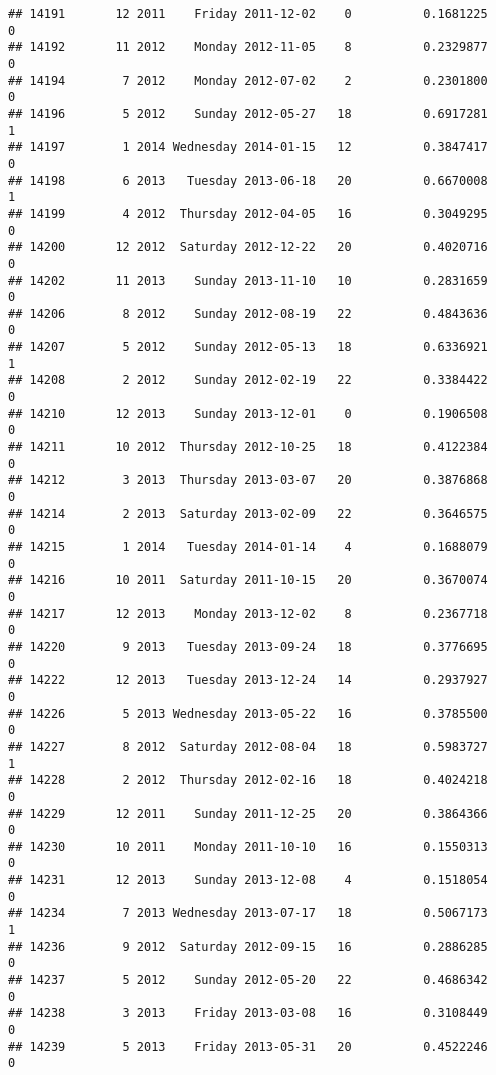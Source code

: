 \documentclass[
]{article}
\begin{document}
\begin{verbatim}
## 14191       12 2011    Friday 2011-12-02    0          0.1681225             0
## 14192       11 2012    Monday 2012-11-05    8          0.2329877             0
## 14194        7 2012    Monday 2012-07-02    2          0.2301800             0
## 14196        5 2012    Sunday 2012-05-27   18          0.6917281             1
## 14197        1 2014 Wednesday 2014-01-15   12          0.3847417             0
## 14198        6 2013   Tuesday 2013-06-18   20          0.6670008             1
## 14199        4 2012  Thursday 2012-04-05   16          0.3049295             0
## 14200       12 2012  Saturday 2012-12-22   20          0.4020716             0
## 14202       11 2013    Sunday 2013-11-10   10          0.2831659             0
## 14206        8 2012    Sunday 2012-08-19   22          0.4843636             0
## 14207        5 2012    Sunday 2012-05-13   18          0.6336921             1
## 14208        2 2012    Sunday 2012-02-19   22          0.3384422             0
## 14210       12 2013    Sunday 2013-12-01    0          0.1906508             0
## 14211       10 2012  Thursday 2012-10-25   18          0.4122384             0
## 14212        3 2013  Thursday 2013-03-07   20          0.3876868             0
## 14214        2 2013  Saturday 2013-02-09   22          0.3646575             0
## 14215        1 2014   Tuesday 2014-01-14    4          0.1688079             0
## 14216       10 2011  Saturday 2011-10-15   20          0.3670074             0
## 14217       12 2013    Monday 2013-12-02    8          0.2367718             0
## 14220        9 2013   Tuesday 2013-09-24   18          0.3776695             0
## 14222       12 2013   Tuesday 2013-12-24   14          0.2937927             0
## 14226        5 2013 Wednesday 2013-05-22   16          0.3785500             0
## 14227        8 2012  Saturday 2012-08-04   18          0.5983727             1
## 14228        2 2012  Thursday 2012-02-16   18          0.4024218             0
## 14229       12 2011    Sunday 2011-12-25   20          0.3864366             0
## 14230       10 2011    Monday 2011-10-10   16          0.1550313             0
## 14231       12 2013    Sunday 2013-12-08    4          0.1518054             0
## 14234        7 2013 Wednesday 2013-07-17   18          0.5067173             1
## 14236        9 2012  Saturday 2012-09-15   16          0.2886285             0
## 14237        5 2012    Sunday 2012-05-20   22          0.4686342             0
## 14238        3 2013    Friday 2013-03-08   16          0.3108449             0
## 14239        5 2013    Friday 2013-05-31   20          0.4522246             0

\end{verbatim}
\end{document}
